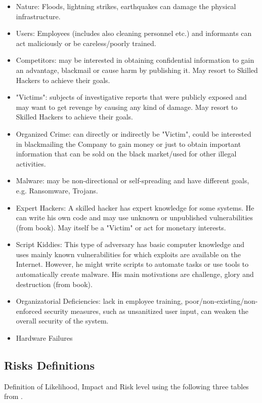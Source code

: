 \documentclass[english]{article}
\begin{document}
\begin{itemize}
\item Nature: Floods, lightning strikes, earthquakes can damage the physical infrastructure.
\item Users: Employees (includes also cleaning personnel etc.) and informants can act maliciously or be careless/poorly trained.
\item Competitors: may be interested in obtaining confidential information to gain an advantage, blackmail or cause harm by publishing it. May resort to Skilled Hackers to achieve their goals.
\item "Victims": subjects of investigative reports that were publicly exposed and may want to get revenge by causing any kind of damage. May resort to Skilled Hackers to achieve their goals.
\item Organized Crime: can directly or indirectly be "Victim", could be interested in blackmailing the Company to gain money or just to obtain important information that can be sold on the black market/used for other illegal activities.
\item Malware: may be non-directional or self-spreading and have different goals, e.g. Ransomware, Trojans.
\item Expert Hackers: A skilled hacker has expert knowledge for some systems. He can write his own code and may use unknown or unpublished vulnerabilities (from book). May itself be a "Victim" or act for monetary interests.
\item Script Kiddies: This type of adversary has basic computer knowledge and uses mainly known vulnerabilities for which exploits are available on the Internet. However, he might write scripts to automate tasks or use tools to automatically create malware. His main motivations are challenge, glory and destruction (from book).
\item Organizatorial Deficiencies: lack in employee training, poor/non-existing/non-enforced security measures, such as unsanitized user input, can weaken the overall security of the system.
\item Hardware Failures
\end{itemize}

\subsection{Risks Definitions}

Definition of Likelihood, Impact and Risk level using the following three
  tables from \cite{ASL_book}.
\end{document}
